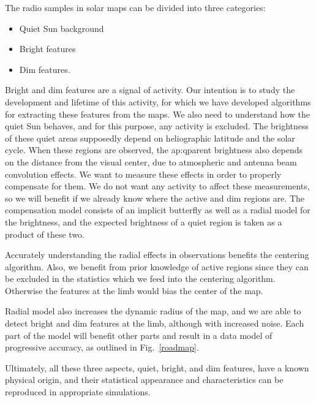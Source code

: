 \documentclass{aa}
\begin{document}
The radio samples in solar maps can be divided into three categories: \begin{itemize} \item Quiet Sun background \item 
Bright features \item Dim features. \end{itemize} Bright and dim features are a signal of activity. Our intention is to 
study the development and lifetime of this activity, for which we have developed algorithms for extracting these 
features from the maps. We also need to understand how the quiet Sun behaves, and for this purpose, any activity is 
excluded. The brightness of these quiet areas supposedly depend on heliographic latitude and the solar cycle. When these 
regions are observed, the ap:qparent brightness also depends on the distance from the visual center, due to atmospheric 
and antenna beam convolution effects. We want to measure these effects in order to properly compensate for them. We do 
not want any activity to affect these measurements, so we will benefit if we already know where the active and dim 
regions are. The compensation model consists of an implicit butterfly as well as a radial model for the brightness, and 
the expected brightness of a quiet region is taken as a product of these two.

Accurately understanding the radial effects in observations benefits the centering algorithm. Also, we benefit from 
prior knowledge of active regions since they can be excluded in the statistics which we feed into the centering 
algorithm. Otherwise the features at the limb would bias the center of the map.

Radial model also increases the dynamic radius of the map, and we are able to detect bright and dim features at the 
limb, although with increased noise. Each part of the model will benefit other parts and result in a data model of progressive accuracy, as outlined in Fig.~\ref{roadmap}.

Ultimately, all these three aspects, quiet, bright, and dim features, have a known physical origin, and their 
statistical appearance and characteristics can be reproduced in appropriate simulations.
\end{document}
